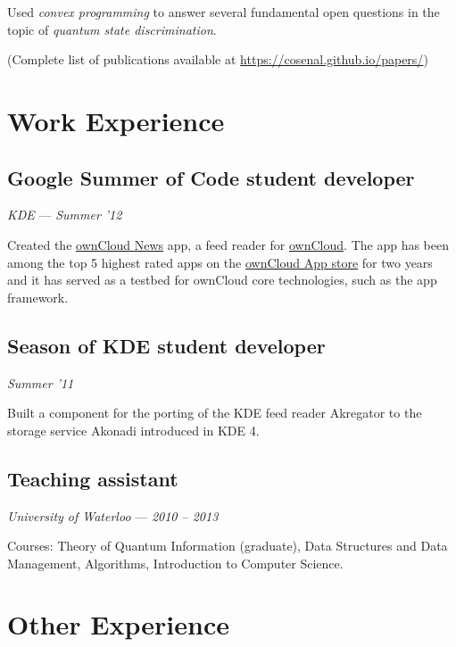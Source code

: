 \documentclass[]{article}
\begin{document}
Used \emph{convex programming} to answer several fundamental open
questions in the topic of \emph{quantum state discrimination}.

(Complete list of publications available at
\url{https://cosenal.github.io/papers/})

\section{Work Experience}\label{work-experience}

\subsection{Google Summer of Code student
developer}\label{google-summer-of-code-student-developer}

\emph{KDE} --- \emph{Summer '12}

Created the \href{https://github.com/owncloud/news}{ownCloud News} app,
a feed reader for \href{http://owncloud.org/}{ownCloud}. The app has
been among the top 5 highest rated apps on the
\href{http://apps.owncloud.com/index.php?xsortmode=high}{ownCloud App
store} for two years and it has served as a testbed for ownCloud core
technologies, such as the app framework.

\subsection{Season of KDE student
developer}\label{season-of-kde-student-developer}

\emph{Summer '11}

Built a component for the porting of the KDE feed reader Akregator to
the storage service Akonadi introduced in KDE 4.

\subsection{Teaching assistant}\label{teaching-assistant}

\emph{University of Waterloo} --- \emph{2010 -- 2013}

Courses: Theory of Quantum Information (graduate), Data Structures and
Data Management, Algorithms, Introduction to Computer Science.

\section{Other Experience}\label{other-experience}
\end{document}
